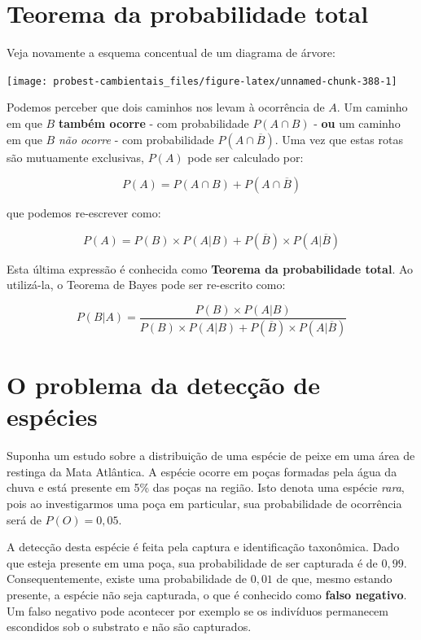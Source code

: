 \documentclass[
]{book}
\begin{document}
\hypertarget{teorema-da-probabilidade-total}{%
\section{Teorema da probabilidade total}\label{teorema-da-probabilidade-total}}

Veja novamente a esquema concentual de um diagrama de árvore:

\begin{center}\texttt{[image: probest-cambientais\_files/figure-latex/unnamed-chunk-388-1]} \end{center}

Podemos perceber que dois caminhos nos levam à ocorrência de \(A\). Um caminho em que \(B\) \textbf{também ocorre} - com probabilidade \(P(A \cap B)\) - \textbf{ou} um caminho em que \(B\) \emph{não ocorre} - com probabilidade \(P(A \cap \overline{B})\). Uma vez que estas rotas são mutuamente exclusivas, \(P(A)\) pode ser calculado por:

\[P(A) = P(A \cap B) + P(A \cap \overline{B})\]

que podemos re-escrever como:

\[P(A) = P(B) \times P(A|B) + P(\overline{B}) \times P(A|\overline{B})\]

Esta última expressão é conhecida como \textbf{Teorema da probabilidade total}. Ao utilizá-la, o Teorema de Bayes pode ser re-escrito como:

\[P(B|A) = \frac{P(B) \times P(A|B)}{P(B) \times P(A|B) + P(\overline{B}) \times P(A|\overline{B})}\]

\hypertarget{o-problema-da-detecuxe7uxe3o-de-espuxe9cies}{%
\section{O problema da detecção de espécies}\label{o-problema-da-detecuxe7uxe3o-de-espuxe9cies}}

Suponha um estudo sobre a distribuição de uma espécie de peixe em uma área de restinga da Mata Atlântica. A espécie ocorre em poças formadas pela água da chuva e está presente em 5\% das poças na região. Isto denota uma espécie \emph{rara}, pois ao investigarmos uma poça em particular, sua probabilidade de ocorrência será de \(P(O) = 0,05\).

A detecção desta espécie é feita pela captura e identificação taxonômica. Dado que esteja presente em uma poça, sua probabilidade de ser capturada é de \(0,99\). Consequentemente, existe uma probabilidade de \(0,01\) de que, mesmo estando presente, a espécie não seja capturada, o que é conhecido como \textbf{falso negativo}. Um falso negativo pode acontecer por exemplo se os indivíduos permanecem escondidos sob o substrato e não são capturados.
\end{document}
